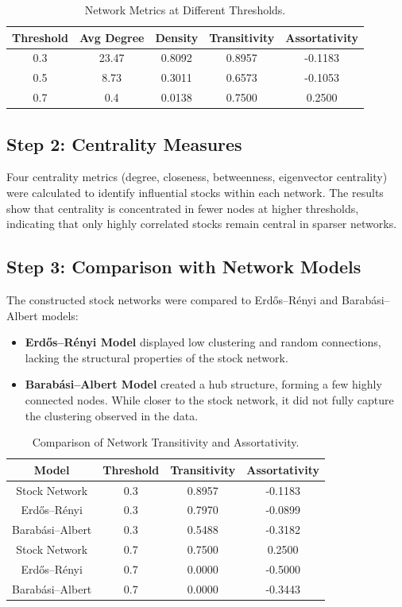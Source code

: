 \documentclass[12pt]{article}
\begin{document}
\begin{table}[H]
    \centering
    \begin{tabular}{|c|c|c|c|c|}
        \hline
        Threshold & Avg Degree & Density & Transitivity & Assortativity \\
        \hline
        0.3 & 23.47 & 0.8092 & 0.8957 & -0.1183 \\
        0.5 & 8.73 & 0.3011 & 0.6573 & -0.1053 \\
        0.7 & 0.4 & 0.0138 & 0.7500 & 0.2500 \\
        \hline
    \end{tabular}
    \caption{Network Metrics at Different Thresholds.}
\end{table}

\subsection{Step 2: Centrality Measures}
Four centrality metrics (degree, closeness, betweenness, eigenvector centrality) were calculated to identify influential stocks within each network. The results show that centrality is concentrated in fewer nodes at higher thresholds, indicating that only highly correlated stocks remain central in sparser networks.

\subsection{Step 3: Comparison with Network Models}
The constructed stock networks were compared to Erdős–Rényi and Barabási–Albert models:
\begin{itemize}
    \item \textbf{Erdős–Rényi Model} displayed low clustering and random connections, lacking the structural properties of the stock network.
    \item \textbf{Barabási–Albert Model} created a hub structure, forming a few highly connected nodes. While closer to the stock network, it did not fully capture the clustering observed in the data.
\end{itemize}

\begin{table}[H]
    \centering
    \begin{tabular}{|c|c|c|c|}
        \hline
        Model & Threshold & Transitivity & Assortativity \\
        \hline
        Stock Network & 0.3 & 0.8957 & -0.1183 \\
        Erdős–Rényi & 0.3 & 0.7970 & -0.0899 \\
        Barabási–Albert & 0.3 & 0.5488 & -0.3182 \\
        Stock Network & 0.7 & 0.7500 & 0.2500 \\
        Erdős–Rényi & 0.7 & 0.0000 & -0.5000 \\
        Barabási–Albert & 0.7 & 0.0000 & -0.3443 \\
        \hline
    \end{tabular}
    \caption{Comparison of Network Transitivity and Assortativity.}
\end{table}
\end{document}
